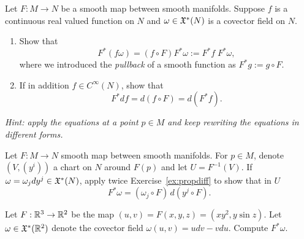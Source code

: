\begin{exercise}\label{ex:propdiff}
	Let $F:M\to N$ be a smooth map between smooth manifolds.
	Suppose $f$ is a continuous real valued function on $N$ and $\omega\in\mathfrak{X}^*(N)$ is a covector field on $N$.
	\begin{enumerate}
		\item Show that
		      \begin{equation}
			      F^*(f\omega) = (f\circ F)F^*\omega := F^* f\; F^*\omega,
		      \end{equation}
		      where we introduced the \emph{pullback} of a smooth function as $F^*g := g\circ F$.
		\item If in addition $f\in C^\infty(N)$, show that
		      \begin{equation}
			      F^* df = d (f\circ F) = d (F^* f).
		      \end{equation}
	\end{enumerate}
	\textit{\small Hint: apply the equations at a point $p\in M$ and keep rewriting the equations in different forms.}
\end{exercise}

\begin{exercise}
	Let $F:M\to N$ smooth map between smooth manifolds.
	For $p\in M$, denote $(V, (y^i))$ a chart on $N$ around $F(p)$ and let $U=F^{-1}(V)$.
	If $\omega = \omega_j dy^j \in\mathfrak{X}^*(N)$, apply twice Exercise~\ref{ex:propdiff} to show that in $U$
	\begin{equation}
		F^*\omega = (\omega_j\circ F)\, d(y^j \circ F).
	\end{equation}

	Let $F:\mathbb{R}^3\to\mathbb{R}^2$ be the map $(u,v) = F(x,y,z) = (x y^2, y \sin z)$.
	Let $\omega\in\mathfrak{X}^*(\mathbb{R}^2)$ denote the covector field $\omega(u,v) = u dv - v du$.
	Compute $F^* \omega$.
\end{exercise}

